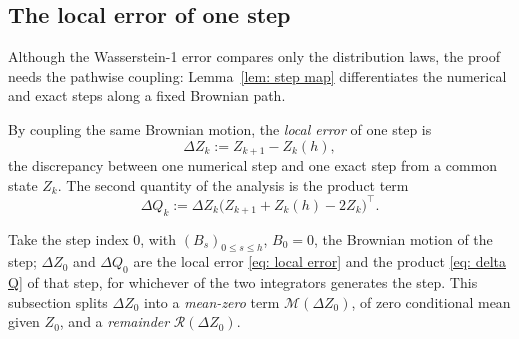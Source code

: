 \documentclass[namedate,webpdf,imanum]{ima-authoring-template}
\newcommand{\Le}{\leqslant}
\theoremstyle{thmstyletwo}
\numberwithin{equation}{section}
\begin{document}
\subsection{The local error of one step}
\label{subsec: local error}

Although the Wasserstein-1 error compares only the distribution laws, the proof needs the pathwise coupling: Lemma~\ref{lem: step map} differentiates the numerical and exact steps along a fixed Brownian path.

By coupling the same Brownian motion, the \emph{local error} of one step is
\begin{equation}
    \Delta Z_k := Z_{k+1} - Z_k(h) ,
    \label{eq: local error}
\end{equation}
the discrepancy between one numerical step and one exact step from a common state $Z_k$. The second quantity of the analysis is the product term
\begin{equation}
    \Delta Q_k := \Delta Z_k \bigl( Z_{k+1} + Z_k(h) - 2 Z_k \bigr)^{\!\top} .
    \label{eq: delta Q}
\end{equation}

Take the step index $0$, with $(B_s)_{0 \Le s \Le h}$, $B_0 = 0$, the Brownian motion of the step; $\Delta Z_0$ and $\Delta Q_0$ are the local error \eqref{eq: local error} and the product \eqref{eq: delta Q} of that step, for whichever of the two integrators generates the step. This subsection splits $\Delta Z_0$ into a \emph{mean-zero} term $\mathcal M(\Delta Z_0)$, of zero conditional mean given $Z_0$, and a \emph{remainder} $\mathcal R(\Delta Z_0)$.
\end{document}
